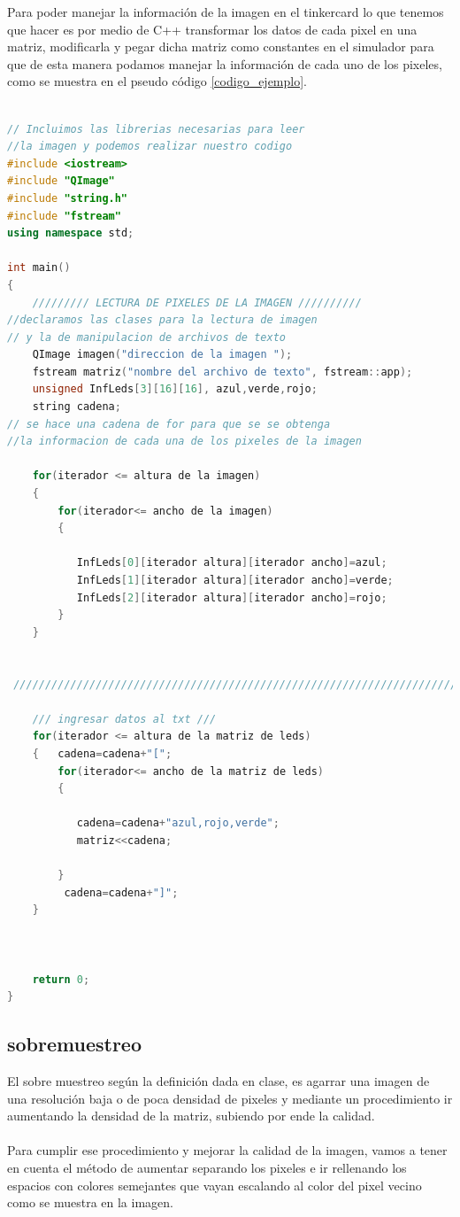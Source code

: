 \documentclass{article}
\begin{document}
Para poder manejar la información de la imagen en el tinkercard lo que tenemos que hacer es por medio de C++ transformar los datos de cada pixel en una matriz, modificarla y pegar dicha matriz como constantes en el simulador para que de esta manera podamos manejar la información de cada uno de los pixeles, como se muestra en el pseudo código \ref{codigo_ejemplo}. 
\begin{lstlisting}[language=C++, label=codigo_ejemplo]

// Incluimos las librerias necesarias para leer
//la imagen y podemos realizar nuestro codigo
#include <iostream>
#include "QImage"
#include "string.h"
#include "fstream"
using namespace std;

int main()
{
    ///////// LECTURA DE PIXELES DE LA IMAGEN //////////
//declaramos las clases para la lectura de imagen
// y la de manipulacion de archivos de texto
    QImage imagen("direccion de la imagen ");
    fstream matriz("nombre del archivo de texto", fstream::app);
    unsigned InfLeds[3][16][16], azul,verde,rojo;
    string cadena;
// se hace una cadena de for para que se se obtenga
//la informacion de cada una de los pixeles de la imagen

    for(iterador <= altura de la imagen)
    {
        for(iterador<= ancho de la imagen)
        {

           InfLeds[0][iterador altura][iterador ancho]=azul;
           InfLeds[1][iterador altura][iterador ancho]=verde;
           InfLeds[2][iterador altura][iterador ancho]=rojo;
        }
    }


 /////////////////////////////////////////////////////////////////////////////////////////

    /// ingresar datos al txt ///
    for(iterador <= altura de la matriz de leds)
    {   cadena=cadena+"[";
        for(iterador<= ancho de la matriz de leds)
        {

           cadena=cadena+"azul,rojo,verde";
           matriz<<cadena;

        }
         cadena=cadena+"]";
    }



    return 0;
}
\end{lstlisting}

\subsection{sobremuestreo} \label{contenido}
El sobre muestreo según la definición dada en clase, es agarrar una imagen de una resolución baja o de poca densidad de pixeles y mediante un procedimiento ir aumentando la densidad   de la matriz, subiendo por ende la calidad.\\\\
Para cumplir ese procedimiento y mejorar la calidad de la imagen, vamos a tener en cuenta el  método de aumentar  separando los pixeles e ir rellenando los espacios con colores semejantes que vayan escalando al color del pixel vecino como se muestra en la imagen. 
\end{document}
